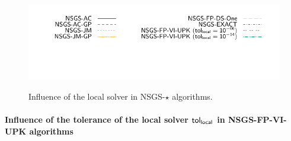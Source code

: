 \documentclass[a4paper]{article}
\begin{document}
\begin{figure}
{\includegraphics[height=\legendheight]{../figure/NSGS/LocalSolver/1.0e-08/50/time/profile-Chain_legend.pdf}} 
  \caption{Influence of the local solver in {\sf NSGS-$\star$} algorithms.}
  \label{fig:NSGS/LocalSolver}
\end{figure}



\paragraph{Influence of the tolerance of the local solver $\sf tol_{local}$ in {\sf NSGS-FP-VI-UPK} algorithms}
\end{document}
